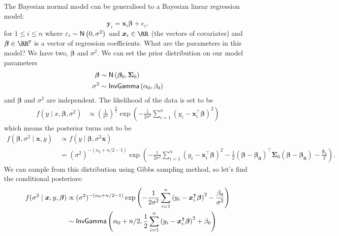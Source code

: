 The Bayesian normal model can be generalised to a Bayesian linear regression model:
\[
    \bm{y}_i = \bm{x}_i \bm{\beta} + \epsilon_i,
\]
for $1 \leq i \leq n$ where $\varepsilon_i \sim {\sf N} \left( 0, \sigma^2 \right)$ and $\bm{x}_i \in \RR$ (the vectors of covariates) and $\bm{\beta} \in \RR^p$ is a vector of regression coefficients. What are the parameters in this model? We have two, $\bm{\beta}$ and $\sigma^2$. We can set the prior distribution on our model parameters
\begin{align*}
    \bm{\beta} & \sim {\sf N} \left( \bm{\beta}_0, \bm{\Sigma}_0 \right) \\
    \sigma^2   & \sim {\sf InvGamma} \left( \alpha_0 , \beta_0 \right)
\end{align*}
and $\bm{\beta}$ and $\sigma^2$ are independent. The likelihood of the data is set to be
\begin{align*}
    f(y \mid x, \bm{\beta}, \sigma^2) & \propto \left( \frac{1}{\sigma^2} \right)^{\frac{n}{2}} \exp \left( - \frac{1}{2 \sigma^2} \sum_{i=1}^{n} \left( y_i - \bm{x}_i^{\intercal} \bm{\beta} \right)^2 \right)
\end{align*}
which means the posterior turns out to be
\begin{align*}
    f \left( \bm{\beta} , \sigma^2 \mid \bm{x} , y \right) \
     & \propto f \left( y \mid \bm{\beta} , \sigma^2 \bm{x} \right)                                                                                                                                                                                                                                            \\
     & = (\sigma^2)^{-(\alpha_0 + n/2 -1)} \exp \left( - \frac{1}{2 \sigma^2} \sum_{i=1}^{n} \left( y_i - \bm{x}_i^{\intercal} \bm{\beta} \right)^2 - \frac{1}{2} \left( \bm{\beta - \bm{\beta}_0} \right)^{\intercal} \bm{\Sigma}_0 \left( \bm{\beta - \bm{\beta}_0} \right) - \frac{\bm{\beta}_0}{2}\right).
\end{align*}
We can sample from this distribution using Gibbs sampling method, so let's find the conditional posteriors:
\begin{align*}
    f ( \sigma^2 \mid \bm{x} , y, \bm{\beta})
     & \propto (\sigma^2)^{-(\alpha_0 + n/2 -1)} \exp \left( - \frac{1}{2 \sigma^2} \sum_{i=1}^{n} \left( y_i - \bm{x}_i^{\intercal} \bm{\beta} \right)^2 - \frac{\beta_0}{\sigma^2}\right) \\
     & \sim {\sf InvGamma} \left( \alpha_0 + n/2, \frac{1}{2} \sum_{i=1}^{n} \left( y_i - \bm{x}_i^{\intercal} \bm{\beta} \right)^2 + \beta_0 \right)
\end{align*}
